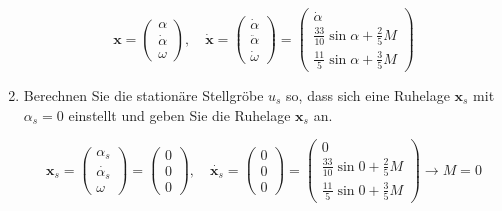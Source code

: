 \documentclass[crop=false]{standalone}
\begin{document}
\begin{task}
\begin{enumerate}[i]
\begin{solution}
 \[\mathbf{x} = \begin{pmatrix} \alpha \\ \dot{\alpha} \\ \omega \end{pmatrix}, \quad 
 \dot{\mathbf{x}} = \begin{pmatrix} \dot{\alpha} \\ \ddot{\alpha} \\ \dot{\omega} \end{pmatrix} = 
 \begin{pmatrix} \dot{\alpha} \\ \frac{33}{10}\sin{\alpha} + \frac{2}{5} M\\ \frac{11}{5} \sin{\alpha} + \frac{3}{5} M  \end{pmatrix}
 \]
    \end{solution}
 \item Berechnen Sie die stationäre Stellgröbe $u_{s}$ so, dass sich eine Ruhelage $\mathbf{x}_{s}$ mit
$\alpha_{s}=0$ einstellt und geben Sie die Ruhelage $\mathbf{x}_{s}$ an.
 \begin{solution}
 \[ \mathbf{x}_s = \begin{pmatrix} \alpha_s \\ \dot{\alpha_s} \\ \omega \end{pmatrix} = \begin{pmatrix} 0 \\ 0 \\ 0 \end{pmatrix}, \quad
 \dot{\mathbf{x}_s} = \begin{pmatrix} 0 \\ 0 \\ 0 \end{pmatrix} = 
 \begin{pmatrix} 0 \\ \frac{33}{10}\sin{0} + \frac{2}{5} M\\ \frac{11}{5} \sin{0} + \frac{3}{5} M  \end{pmatrix} \rightarrow  M = 0\]
 

\end{solution}
\end{enumerate}
\end{task}
\end{document}
